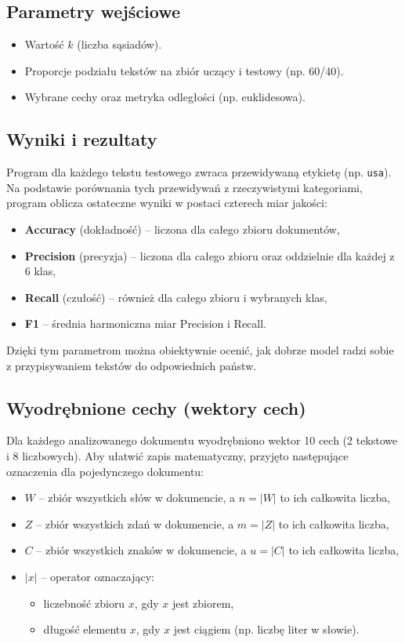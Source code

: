 \documentclass{article}
\begin{document}
\subsection{Parametry wejściowe}
\begin{itemize}
	\item Wartość $k$ (liczba sąsiadów).
	\item Proporcje podziału tekstów na zbiór uczący i testowy (np. 60/40).
	\item Wybrane cechy oraz metryka odległości (np. euklidesowa).
\end{itemize}

\subsection{Wyniki i rezultaty}
Program dla każdego tekstu testowego zwraca przewidywaną etykietę (np. \texttt{usa}). Na podstawie porównania tych przewidywań z rzeczywistymi kategoriami, program oblicza ostateczne wyniki w postaci czterech miar jakości:
\begin{itemize}
	\item \textbf{Accuracy} (dokładność) – liczona dla całego zbioru dokumentów,
	\item \textbf{Precision} (precyzja) – liczona dla całego zbioru oraz oddzielnie dla każdej z 6 klas,
	\item \textbf{Recall} (czułość) – również dla całego zbioru i wybranych klas,
	\item \textbf{F1} – średnia harmoniczna miar Precision i Recall.
\end{itemize}
Dzięki tym parametrom można obiektywnie ocenić, jak dobrze model radzi sobie z przypisywaniem tekstów do odpowiednich państw.

\subsection{Wyodrębnione cechy (wektory cech)}
Dla każdego analizowanego dokumentu wyodrębniono wektor 10 cech (2 tekstowe i 8 liczbowych). Aby ułatwić zapis matematyczny, przyjęto następujące oznaczenia dla pojedynczego dokumentu:
\begin{itemize}
    \item $W$ – zbiór wszystkich słów w dokumencie, a $n = |W|$ to ich całkowita liczba,
    \item $Z$ – zbiór wszystkich zdań w dokumencie, a $m = |Z|$ to ich całkowita liczba,
    \item $C$ – zbiór wszystkich znaków w dokumencie, a $u = |C|$ to ich całkowita liczba,
    \item $|x|$ – operator oznaczający: \begin{itemize}
                                            \item liczebność zbioru $x$, gdy $x$ jest zbiorem,
                                            \item długość elementu $x$, gdy $x$ jest ciągiem (np. liczbę liter w słowie).
                                        \end{itemize}
\end{itemize}
\end{document}
